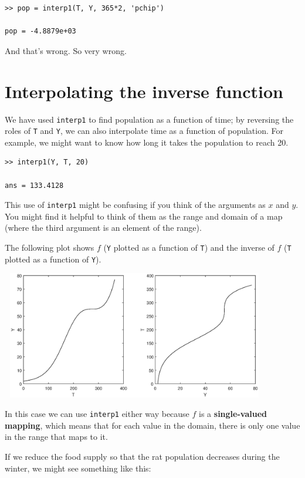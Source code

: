 \documentclass[
]{book}
\begin{document}
\begin{verbatim}
>> pop = interp1(T, Y, 365*2, 'pchip')

pop = -4.8879e+03
\end{verbatim}

And that's wrong.  So very wrong.


\section{Interpolating the inverse function}

We have used {\tt interp1} to find population as a function of time;
by reversing the roles of {\tt T} and {\tt Y}, we can also interpolate
time as a function of population.  For example, we might want to know
how long it takes the population to reach 20.

\begin{verbatim}
>> interp1(Y, T, 20)

ans = 133.4128
\end{verbatim}

This use of {\tt interp1} might be confusing if you think of the
arguments as $x$ and $y$.  You might find it helpful to think of them
as the range and domain of a map (where the third argument is
an element of the range).

The following plot shows $f$ ({\tt Y} plotted as a function of {\tt T})
and the inverse of $f$ ({\tt T} plotted as a function of {\tt Y}).

\beforefig
\centerline{\includegraphics[height=2.2in,width=4.6in]{figs/ratplot.eps}}

In this case we can use {\tt interp1} either way because $f$ is
a {\bf single-valued mapping}, which means that for each value in
the domain, there is only one value in the range that maps to it.

If we reduce the food supply so that the rat population decreases
during the winter, we might see something like this:
\end{document}
